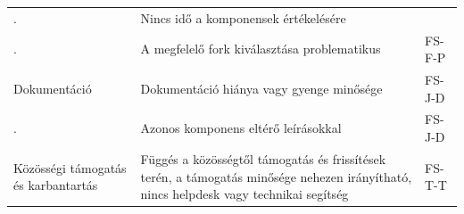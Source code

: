 \documentclass[12pt,magyar,a4paper,oneside]{scrreprt}
\begin{document}
\begin{longtable}[]{@{}lll@{}}
\begin{minipage}[t]{0.24\columnwidth}
.\strut
\end{minipage} & \begin{minipage}[t]{0.49\columnwidth}\raggedright
Nincs idő a komponensek értékelésére\strut
\end{minipage} & \begin{minipage}[t]{0.18\columnwidth}\raggedright
\strut
\end{minipage}\tabularnewline
\begin{minipage}[t]{0.24\columnwidth}\raggedright
.\strut
\end{minipage} & \begin{minipage}[t]{0.49\columnwidth}\raggedright
A megfelelő fork kiválasztása problematikus\strut
\end{minipage} & \begin{minipage}[t]{0.18\columnwidth}\raggedright
FS-F-P\strut
\end{minipage}\tabularnewline
\begin{minipage}[t]{0.24\columnwidth}\raggedright
Dokumentáció\strut
\end{minipage} & \begin{minipage}[t]{0.49\columnwidth}\raggedright
Dokumentáció hiánya vagy gyenge minősége\strut
\end{minipage} & \begin{minipage}[t]{0.18\columnwidth}\raggedright
FS-J-D\strut
\end{minipage}\tabularnewline
\begin{minipage}[t]{0.24\columnwidth}\raggedright
.\strut
\end{minipage} & \begin{minipage}[t]{0.49\columnwidth}\raggedright
Azonos komponens eltérő leírásokkal\strut
\end{minipage} & \begin{minipage}[t]{0.18\columnwidth}\raggedright
FS-J-D\strut
\end{minipage}\tabularnewline
\begin{minipage}[t]{0.24\columnwidth}\raggedright
Közösségi támogatás és karbantartás\strut
\end{minipage} & \begin{minipage}[t]{0.49\columnwidth}\raggedright
Függés a közösségtől támogatás és frissítések terén, a támogatás
minősége nehezen irányítható, nincs helpdesk vagy technikai
segítség\strut
\end{minipage} & \begin{minipage}[t]{0.18\columnwidth}\raggedright
FS-T-T\strut
\end{minipage}\tabularnewline

\end{longtable}
\end{document}
